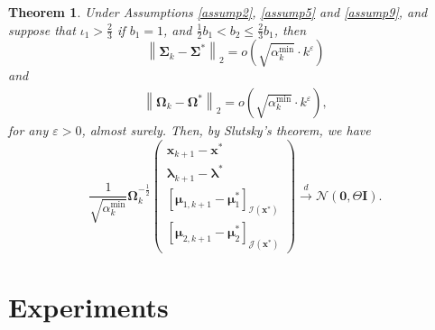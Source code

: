 \documentclass[aos]{imsart}
\numberwithin{equation}{section}
\theoremstyle{plain}
\newtheorem{theorem}{Theorem}
\begin{document}
\begin{theorem}
\label{theorem_pratical_normality}
    Under Assumptions \ref{assump2}, \ref{assump5} and  \ref{assump9}, and suppose that $\iota_1>\frac{2}{3}$ if $b_1=1$, and $\frac{1}{2} b_1 < b_2 \leq \frac{2}{3}b_1$, then 
    \begin{equation}
        \left\| \bm{\Sigma}_{k} - \bm{\Sigma}^{*} \right\|_2 = o\left( \sqrt{\alpha_k^{\text{min}}} \cdot k^{\varepsilon}\right)
    \end{equation}
    and
    \begin{equation}
        \begin{split}
             \left\| \bm{\Omega}_{k} - \bm{\Omega}^{*} \right\|_2 = o\left( \sqrt{\alpha_k^{\text{min}}} \cdot k^{\varepsilon}\right),
        \end{split}
    \end{equation}
    for any $\varepsilon > 0$, almost surely. 
    Then, by Slutsky's theorem, we have
    \begin{equation}
        \frac{1}{\sqrt{\alpha_k^{\text{min}}}} \bm{\Omega}_k^{-\frac{1}{2}}\left( \begin{array}{c}
    \bm{x}_{k+1} - \bm{x}^{*}  \\
    \bm{\lambda}_{k+1} - \bm{\lambda}^{*} \\
    \left[ \bm{\mu}_{1,k+1} - \bm{\mu}_{1}^{*}\right]_{\mathcal{I}(\bm{x}^{*})} \\
    \left[ \bm{\mu}_{2,k+1} - \bm{\mu}_{2}^{*} \right]_{\mathcal{J}(\bm{x}^{*})} 
    \end{array} \right) \stackrel{d}{\longrightarrow} \mathcal{N} \left( \bm{0}, \Theta \bm{I}\right) .
    \end{equation}
\end{theorem}


\section{Experiments}
\label{sec:experiments}
\end{document}
